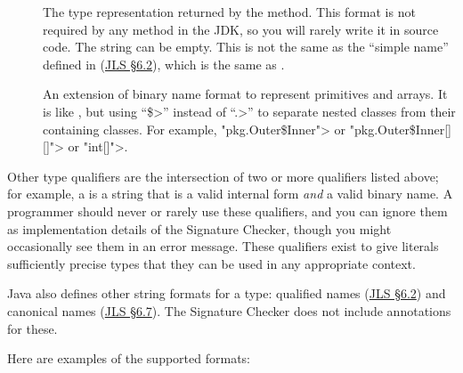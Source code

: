 \begin{description}
\item[]
  The type representation returned by the
  method.  This format is not required by any method in the JDK, so you
  will rarely write it in source code.  The string can be empty.  This
  is not the same as the ``simple name'' defined in
  (\href{https://docs.oracle.com/javase/specs/jls/se11/html/jls-6.html#jls-6.2}{JLS
    \S 6.2}), which is the same as
  .

\item[]
  An extension of binary name format to represent primitives and arrays.
  It is like , but using
  ``\<\$>'' instead of ``\<.>'' to separate nested classes from their
  containing classes.  For example, \<"pkg.Outer\$Inner"> or
  \<"pkg.Outer\$Inner[][]"> or \<"int[]">.

\end{description}

Other type qualifiers are the intersection of two or more qualifiers listed
above; for example, a
 is a string
that is a valid internal form \emph{and} a valid binary name.  A
programmer should never or rarely use these qualifiers, and you can ignore
them as implementation details of the Signature Checker, though you might
occasionally see them in an error message.  These qualifiers exist to give
literals sufficiently precise types that they can be used in any
appropriate context.

Java also defines other string formats for a type:  qualified names
(\href{https://docs.oracle.com/javase/specs/jls/se11/html/jls-6.html#jls-6.2}{JLS
  \S 6.2}) and canonical names
(\href{https://docs.oracle.com/javase/specs/jls/se11/html/jls-6.html#jls-6.7}{JLS
  \S 6.7}).  The Signature Checker does not include annotations for these.

\label{signature-annotations-table}

Here are examples of the supported formats:
\label{signature-annotations-examples}


\newcommand{\naforanon}{\emph{n/a {\smaller for anonymous class}}}
\newcommand{\naforanonarray}{\emph{n/a {\smaller for array of anon.~class}}}
\newcommand{\naforprim}{\emph{n/a {\smaller for primitive type}}}
\newcommand{\naforarray}{\emph{n/a {\smaller for array type}}}
\newcommand{\emptystring}{\emph{\smaller (empty string)}}

